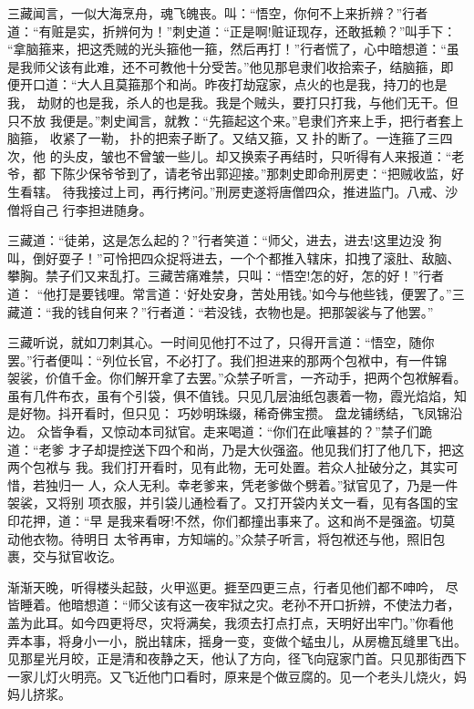 三藏闻言，一似大海烹舟，魂飞魄丧。叫：“悟空，你何不上来折辨？”行者
道：“有赃是实，折辨何为！”刺史道：“正是啊!赃证现存，还敢抵赖？”叫手下：
“拿脑箍来，把这秃贼的光头箍他一箍，然后再打！”行者慌了，心中暗想道：“虽
是我师父该有此难，还不可教他十分受苦。”他见那皂隶们收拾索子，结脑箍，即
便开口道：“大人且莫箍那个和尚。昨夜打劫寇家，点火的也是我，持刀的也是我，
劫财的也是我，杀人的也是我。我是个贼头，要打只打我，与他们无干。但只不放
我便是。”刺史闻言，就教：“先箍起这个来。”皂隶们齐来上手，把行者套上脑箍，
收紧了一勒，扑的把索子断了。又结又箍，又扑的断了。一连箍了三四次，他
的头皮，皱也不曾皱一些儿。却又换索子再结时，只听得有人来报道：“老爷，都
下陈少保爷爷到了，请老爷出郭迎接。”那刺史即命刑房吏：“把贼收监，好生看辖。
待我接过上司，再行拷问。”刑房吏遂将唐僧四众，推进监门。八戒、沙僧将自己
行李担进随身。

三藏道：“徒弟，这是怎么起的？”行者笑道：“师父，进去，进去!这里边没
狗叫，倒好耍子！”可怜把四众捉将进去，一个个都推入辖床，扣拽了滚肚、敌脑、
攀胸。禁子们又来乱打。三藏苦痛难禁，只叫：“悟空!怎的好，怎的好！”行者道：
“他打是要钱哩。常言道：‘好处安身，苦处用钱。’如今与他些钱，便罢了。”三
藏道：“我的钱自何来？”行者道：“若没钱，衣物也是。把那袈裟与了他罢。”

三藏听说，就如刀刺其心。一时间见他打不过了，只得开言道：“悟空，随你
罢。”行者便叫：“列位长官，不必打了。我们担进来的那两个包袱中，有一件锦
袈裟，价值千金。你们解开拿了去罢。”众禁子听言，一齐动手，把两个包袱解看。
虽有几件布衣，虽有个引袋，俱不值钱。只见几层油纸包裹着一物，霞光焰焰，知
是好物。抖开看时，但只见：
巧妙明珠缀，稀奇佛宝攒。
盘龙铺绣结，飞凤锦沿边。
众皆争看，又惊动本司狱官。走来喝道：“你们在此嚷甚的？”禁子们跪道：“老爹
才子却提控送下四个和尚，乃是大伙强盗。他见我们打了他几下，把这两个包袱与
我。我们打开看时，见有此物，无可处置。若众人扯破分之，其实可惜，若独归一
人，众人无利。幸老爹来，凭老爹做个劈着。”狱官见了，乃是一件袈裟，又将别
项衣服，并引袋儿通检看了。又打开袋内关文一看，见有各国的宝印花押，道：“早
是我来看呀!不然，你们都撞出事来了。这和尚不是强盗。切莫动他衣物。待明日
太爷再审，方知端的。”众禁子听言，将包袱还与他，照旧包裹，交与狱官收讫。

渐渐天晚，听得楼头起鼓，火甲巡更。捱至四更三点，行者见他们都不呻吟，
尽皆睡着。他暗想道：“师父该有这一夜牢狱之灾。老孙不开口折辨，不使法力者，
盖为此耳。如今四更将尽，灾将满矣，我须去打点打点，天明好出牢门。”你看他
弄本事，将身小一小，脱出辖床，摇身一变，变做个蜢虫儿，从房檐瓦缝里飞出。
见那星光月皎，正是清和夜静之天，他认了方向，径飞向寇家门首。只见那街西下
一家儿灯火明亮。又飞近他门口看时，原来是个做豆腐的。见一个老头儿烧火，妈
妈儿挤浆。

